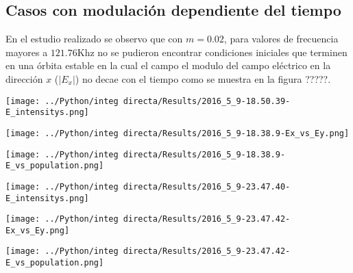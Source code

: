 		
	\subsection{Casos con modulación dependiente del tiempo}
	
	En el estudio realizado se observo que con $m=0.02$, para valores de frecuencia mayores a $121.76 $Khz no se pudieron encontrar condiciones iniciales que terminen en una órbita estable en la cual el campo el modulo del campo eléctrico en la dirección $x$ ($|E_x|$) no decae con el tiempo como se muestra en la figura ?????.
	
	
	\begin{minipage}{0.7\textwidth}
		
		\centering
		\texttt{[image: ../Python/integ directa/Results/2016\_5\_9-18.50.39-E\_intensitys.png]}
		
	\end{minipage}
	
	\begin{minipage}{0.5\textwidth}
		
		\centering
		\texttt{[image: ../Python/integ directa/Results/2016\_5\_9-18.38.9-Ex\_vs\_Ey.png]}
		
	\end{minipage}
	\begin{minipage}{0.5\textwidth}
		
		\centering
		\texttt{[image: ../Python/integ directa/Results/2016\_5\_9-18.38.9-E\_vs\_population.png]}
		
	\end{minipage}
	
	
	
	\begin{minipage}{0.6\textwidth}
		
		\centering
		\texttt{[image: ../Python/integ directa/Results/2016\_5\_9-23.47.40-E\_intensitys.png]}
		
	\end{minipage}
	
	\begin{minipage}{0.5\textwidth}
		
		\centering
		\texttt{[image: ../Python/integ directa/Results/2016\_5\_9-23.47.42-Ex\_vs\_Ey.png]}
		
	\end{minipage}
	\begin{minipage}{0.5\textwidth}
		
		\centering
		\texttt{[image: ../Python/integ directa/Results/2016\_5\_9-23.47.42-E\_vs\_population.png]}
		
	\end{minipage}
	
